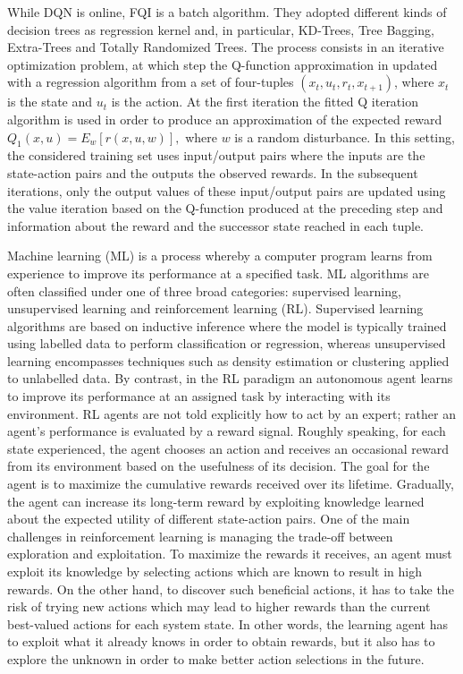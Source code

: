 While DQN is online, FQI is a batch algorithm. They adopted different kinds of decision trees as regression kernel and, in particular, KD-Trees, Tree Bagging, Extra-Trees and Totally Randomized Trees. The process consists in an iterative optimization problem, at which step the Q-function approximation in updated with a regression algorithm from a set of four-tuples \((x_t , u_t, r_t, x_{t+1})\), where $x_t$ is the state and $u_t$ is the action.  At the first iteration the fitted Q iteration algorithm is used in order to produce an approximation of the expected reward \(Q_1(x, u) = E_w [r(x, u, w)],\) where $w$ is a random disturbance. In this setting, the considered training set uses input/output pairs where the inputs are the state-action pairs and the outputs the observed rewards. In the subsequent iterations, only the output values of these input/output pairs are updated using the value iteration based on the Q-function produced at the preceding step and information about the reward and the successor state reached in each tuple. 







Machine learning (ML) is a process whereby a computer program learns from experience to improve its performance at a specified task. ML algorithms are often classified under one of three broad categories: supervised learning, unsupervised learning and reinforcement learning (RL). Supervised learning algorithms are based on inductive inference where the model is typically trained using labelled data to perform classification or regression, whereas unsupervised learning encompasses techniques such as density estimation or clustering
applied to unlabelled data. By contrast, in the RL paradigm an autonomous agent learns to improve its performance at an assigned task by interacting with its environment. RL agents are not told explicitly how to act by an expert; rather an agent’s performance is evaluated by a reward signal.
Roughly speaking, for each state experienced, the agent chooses an action and receives an occasional reward from its environment based on the usefulness of its decision. The goal for the agent is to maximize the cumulative rewards received over its lifetime. Gradually, the agent can increase its long-term reward by
exploiting knowledge learned about the expected utility of different state-action pairs. One of the main challenges in reinforcement learning is managing the trade-off between exploration and exploitation. To maximize the rewards it receives, an agent must exploit its knowledge by selecting actions which are
known to result in high rewards. On the other hand, to discover such beneficial actions, it has to take the risk of trying new actions which may lead to higher rewards than the current best-valued actions for each system state. In other words, the learning agent has to exploit what it already knows in order to obtain rewards, but it also has to explore the unknown in order to make better action selections in the future.




